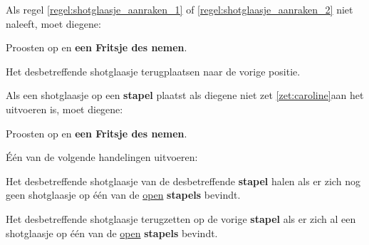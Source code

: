 \vervolgLijst{}
\item Als \eenSpeler regel \ref{regel:shotglaasje_aanraken_1} of \ref{regel:shotglaasje_aanraken_2} niet naleeft, moet diegene:
\puntLijst{}
\item Proosten op  en \textbf{een Fritsje des nemen}\footnotemark[1].
\item Het desbetreffende shotglaasje terugplaatsen naar de vorige positie.
\eindPuntLijst{}
\eindLijst{}


\vervolgLijst{}
\item Als \eenSpeler een shotglaasje op een \textbf{stapel} plaatst als diegene niet zet \ref{zet:caroline}\footnotemark[2] aan het uitvoeren is, moet diegene:
\puntLijst{}
\item Proosten op  en \textbf{een Fritsje des nemen}\footnotemark[1].
\item Één van de volgende handelingen uitvoeren:
\numeriekeLijst{}
\item Het desbetreffende shotglaasje van de desbetreffende \textbf{stapel} halen als er zich nog geen shotglaasje op \'e\'en van de \ul{open} \textbf{stapels} bevindt.
\item Het desbetreffende shotglaasje terugzetten op de vorige \textbf{stapel} als er zich al een shotglaasje op \'e\'en van de \ul{open} \textbf{stapels} bevindt.
\eindNumeriekeLijst{}
\eindPuntLijst{}
\eindLijst{}

